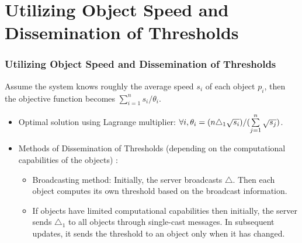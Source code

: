 \documentclass{beamer}
\begin{document}
\section{Utilizing Object Speed and Dissemination of Thresholds}
\begin{frame}
  \frametitle{Utilizing Object Speed and Dissemination of Thresholds}
  Assume the system knows roughly the average speed $s_{i}$ of each object $p_{i}$, then the objective function becomes $\sum\limits_{i=1}^n s_i/\theta_i$.
  \begin{itemize}
    \item Optimal solution using Lagrange multiplier: $\forall i,\space \theta_{i} = (n\triangle_{1} \sqrt{s_{i}})/(\sum\limits_{j=1}^n \sqrt{s_{j}})$.
    \item Methods of Dissemination of Thresholds (depending on the computational capabilities of the objects) :
          \begin{itemize}
            \item Broadcasting method: Initially, the
                  server broadcasts $\triangle$. Then each object
                  computes its own threshold based on the broadcast
                  information.
            \item If objects have limited
                  computational capabilities then initially, the server sends $\triangle_{1}$ to
                  all objects through single-cast messages. In subsequent
                  updates, it sends the threshold to an object only when it has
                  changed.
          \end{itemize}
  \end{itemize}


\end{frame}



\end{document}
